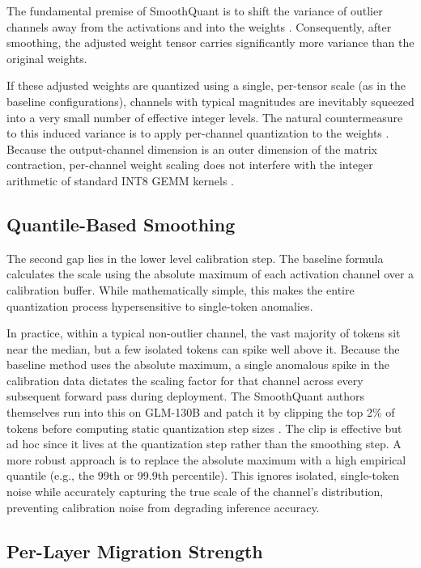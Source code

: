 The fundamental premise of SmoothQuant is to shift the variance of outlier channels away from the activations and into the weights \cite{smoothquant_paper}. Consequently, after smoothing, the adjusted weight tensor carries significantly more variance than the original weights.

If these adjusted weights are quantized using a single, per-tensor scale (as in the baseline configurations), channels with typical magnitudes are inevitably squeezed into a very small number of effective integer levels. The natural countermeasure to this induced variance is to apply per-channel quantization to the weights \cite{llm_int8_paper}. Because the output-channel dimension is an outer dimension of the matrix contraction, per-channel weight scaling does not interfere with the integer arithmetic of standard INT8 GEMM kernels \cite{smoothquant_paper}.

\subsection{Quantile-Based Smoothing}

The second gap lies in the lower level calibration step. The baseline formula calculates the scale using the absolute maximum of each activation channel over a calibration buffer. While mathematically simple, this makes the entire quantization process hypersensitive to single-token anomalies.

In practice, within a typical non-outlier channel, the vast majority of tokens sit near the median, but a few isolated tokens can spike well above it. Because the baseline method uses the absolute maximum, a single anomalous spike in the calibration data dictates the scaling factor for that channel across every subsequent forward pass during deployment. The SmoothQuant authors themselves run into this on GLM-130B and patch it by clipping the top 2\% of tokens before computing static quantization step sizes \cite{smoothquant_paper}. The clip is effective but ad hoc since it lives at the quantization step rather than the smoothing step. A more robust approach is to replace the absolute maximum with a high empirical quantile (e.g., the 99th or 99.9th percentile). This ignores isolated, single-token noise while accurately capturing the true scale of the channel's distribution, preventing calibration noise from degrading inference accuracy.

\subsection{Per-Layer Migration Strength}

